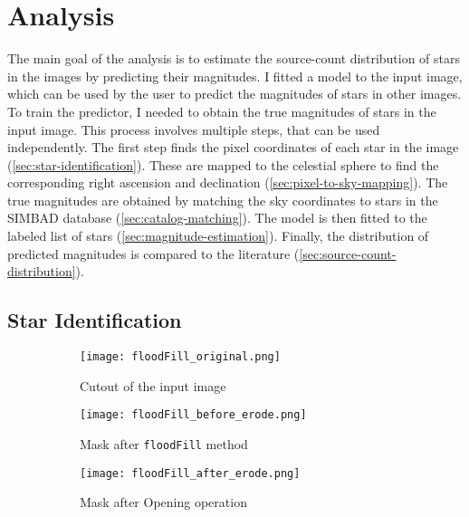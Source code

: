 
\section{Analysis}
\label{sec:analysis}

The main goal of the analysis is to estimate the source-count distribution of stars in the
images by predicting their magnitudes. I fitted a model to the input image, which can be
used by the user to predict the magnitudes of stars in other images. To train the
predictor, I needed to obtain the true magnitudes of stars in the input image. This
process involves multiple steps, that can be used independently. The first step finds the
pixel coordinates of each star in the image (\autoref{sec:star-identification}). These are
mapped to the celestial sphere to find the corresponding right ascension and declination
(\autoref{sec:pixel-to-sky-mapping}). The true magnitudes are obtained by matching the
sky coordinates to stars in the SIMBAD database (\autoref{sec:catalog-matching}). The
model is then fitted to the labeled list of stars (\autoref{sec:magnitude-estimation}).
Finally, the distribution of predicted magnitudes is compared to the literature
(\autoref{sec:source-count-distribution}).

\subsection{Star Identification}
\label{sec:star-identification}

\begin{figure}[tb]
  \centering
  \begin{subfigure}{.33\textwidth}
    \centering
    \texttt{[image: floodFill\_original.png]}
    \caption{Cutout of the input image}
    \label{fig:floodfill-original}
  \end{subfigure}%
  \hfill
  \begin{subfigure}{.33\textwidth}
    \centering
    \texttt{[image: floodFill\_before\_erode.png]}
    \caption{Mask after \texttt{floodFill} method}
    \label{fig:floodfill}
  \end{subfigure}%
  \hfill
  \begin{subfigure}{.33\textwidth}
    \centering
    \texttt{[image: floodFill\_after\_erode.png]}
    \caption{Mask after Opening operation}
    \label{fig:opening}
  \end{subfigure}
  \caption{}
  \label{fig:star-identification}
\end{figure}

